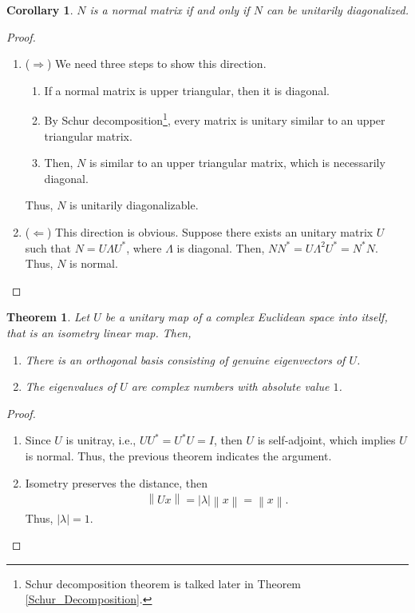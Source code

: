 \documentclass[10pt]{book}
\newtheorem{theorem}{Theorem}[chapter]
\newtheorem{corollary}{Corollary}[theorem]
\theoremstyle{definition}
\numberwithin{equation}{chapter}
\begin{document}
\begin{corollary}\label{normal_matrix_unitary_diagonal}
$N$ is a normal matrix if and only if $N$ can be unitarily diagonalized.
\end{corollary}
\begin{proof}
~\begin{enumerate}[label=(\alph*)]
    \item ($\Rightarrow$) We need three steps to show this direction\cite{25}.
    \begin{enumerate}[label=\arabic**)]
        \item If a normal matrix is upper triangular, then it is diagonal.
        
        \item By Schur decomposition\footnote{Schur decomposition theorem is talked later in Theorem \ref{Schur_Decomposition}.}, every matrix is unitary similar to an upper triangular matrix.
        
        \item Then, $N$ is similar to an upper triangular matrix, which is necessarily diagonal.
    \end{enumerate}
    Thus, $N$ is unitarily diagonalizable. 
    
    \item ($\Leftarrow$) This direction is obvious. Suppose there exists an unitary matrix $U$ such that $N = U \Lambda U^*$, where $\Lambda$ is diagonal. Then, $N N^* = U \Lambda^2 U^* = N^* N$. Thus, $N$ is normal.
\end{enumerate}
\end{proof}

\medskip

\begin{theorem}\label{isometry_property}
Let $U$ be a unitary map of a complex Euclidean space into itself, that is an isometry linear map. Then,
\begin{enumerate}[label=(\alph*)]
    \item There is an orthogonal basis consisting of genuine eigenvectors of $U$.
    \item The eigenvalues of $U$ are complex numbers with absolute value $1$.
\end{enumerate}
\end{theorem}
\begin{proof}
~\begin{enumerate}[label=(\alph*)]
    \item Since $U$ is unitray, i.e., $UU^* = U^*U = I$, then $U$ is self-adjoint, which implies $U$ is normal. Thus,  the previous theorem indicates the argument.
    \item Isometry preserves the distance, then 
    \begin{align*}
        \left\|Ux\right\| = |\lambda| \left\|x\right\| = \left\|x\right\|.
    \end{align*}
    Thus, $\left|\lambda\right| = 1$.
\end{enumerate}
\end{proof}
\end{document}
